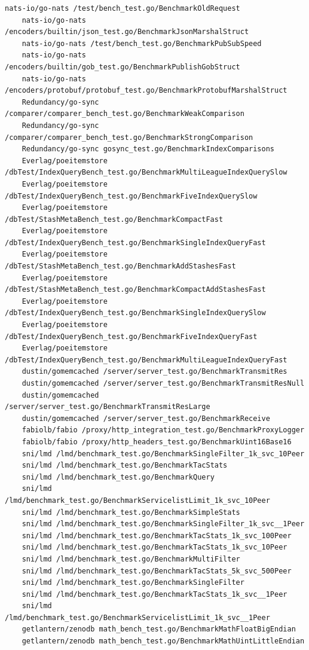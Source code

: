 \documentclass{seal_thesis}
\begin{document}
\begin{lstlisting}[basicstyle=\tiny]
	nats-io/go-nats /test/bench_test.go/BenchmarkOldRequest
	nats-io/go-nats /encoders/builtin/json_test.go/BenchmarkJsonMarshalStruct
	nats-io/go-nats /test/bench_test.go/BenchmarkPubSubSpeed
	nats-io/go-nats /encoders/builtin/gob_test.go/BenchmarkPublishGobStruct
	nats-io/go-nats /encoders/protobuf/protobuf_test.go/BenchmarkProtobufMarshalStruct
	Redundancy/go-sync /comparer/comparer_bench_test.go/BenchmarkWeakComparison
	Redundancy/go-sync /comparer/comparer_bench_test.go/BenchmarkStrongComparison
	Redundancy/go-sync gosync_test.go/BenchmarkIndexComparisons
	Everlag/poeitemstore /dbTest/IndexQueryBench_test.go/BenchmarkMultiLeagueIndexQuerySlow
	Everlag/poeitemstore /dbTest/IndexQueryBench_test.go/BenchmarkFiveIndexQuerySlow
	Everlag/poeitemstore /dbTest/StashMetaBench_test.go/BenchmarkCompactFast
	Everlag/poeitemstore /dbTest/IndexQueryBench_test.go/BenchmarkSingleIndexQueryFast
	Everlag/poeitemstore /dbTest/StashMetaBench_test.go/BenchmarkAddStashesFast
	Everlag/poeitemstore /dbTest/StashMetaBench_test.go/BenchmarkCompactAddStashesFast
	Everlag/poeitemstore /dbTest/IndexQueryBench_test.go/BenchmarkSingleIndexQuerySlow
	Everlag/poeitemstore /dbTest/IndexQueryBench_test.go/BenchmarkFiveIndexQueryFast
	Everlag/poeitemstore /dbTest/IndexQueryBench_test.go/BenchmarkMultiLeagueIndexQueryFast
	dustin/gomemcached /server/server_test.go/BenchmarkTransmitRes
	dustin/gomemcached /server/server_test.go/BenchmarkTransmitResNull
	dustin/gomemcached /server/server_test.go/BenchmarkTransmitResLarge
	dustin/gomemcached /server/server_test.go/BenchmarkReceive
	fabiolb/fabio /proxy/http_integration_test.go/BenchmarkProxyLogger
	fabiolb/fabio /proxy/http_headers_test.go/BenchmarkUint16Base16
	sni/lmd /lmd/benchmark_test.go/BenchmarkSingleFilter_1k_svc_10Peer
	sni/lmd /lmd/benchmark_test.go/BenchmarkTacStats
	sni/lmd /lmd/benchmark_test.go/BenchmarkQuery
	sni/lmd /lmd/benchmark_test.go/BenchmarkServicelistLimit_1k_svc_10Peer
	sni/lmd /lmd/benchmark_test.go/BenchmarkSimpleStats
	sni/lmd /lmd/benchmark_test.go/BenchmarkSingleFilter_1k_svc__1Peer
	sni/lmd /lmd/benchmark_test.go/BenchmarkTacStats_1k_svc_100Peer
	sni/lmd /lmd/benchmark_test.go/BenchmarkTacStats_1k_svc_10Peer
	sni/lmd /lmd/benchmark_test.go/BenchmarkMultiFilter
	sni/lmd /lmd/benchmark_test.go/BenchmarkTacStats_5k_svc_500Peer
	sni/lmd /lmd/benchmark_test.go/BenchmarkSingleFilter
	sni/lmd /lmd/benchmark_test.go/BenchmarkTacStats_1k_svc__1Peer
	sni/lmd /lmd/benchmark_test.go/BenchmarkServicelistLimit_1k_svc__1Peer
	getlantern/zenodb math_bench_test.go/BenchmarkMathFloatBigEndian
	getlantern/zenodb math_bench_test.go/BenchmarkMathUintLittleEndian

\end{lstlisting}
\end{document}
